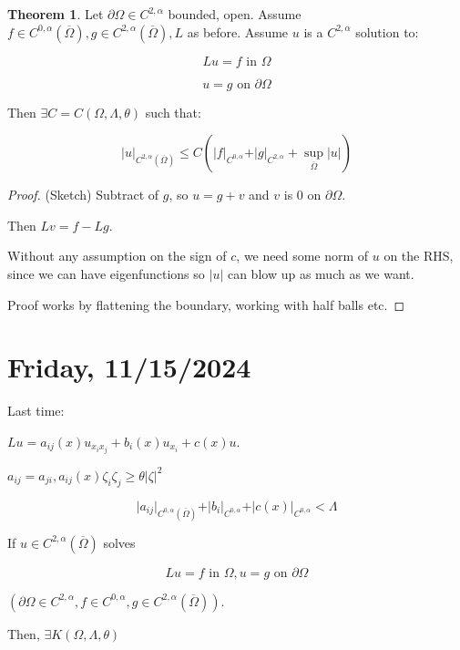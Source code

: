\documentclass{article}
\theoremstyle{definition}
\newtheorem{theorem}{Theorem}
\begin{document}
\begin{theorem}
    Let \(\partial\Omega \in C^{2,\alpha}\) bounded, open. Assume \(f\in C^{0,\alpha}(\overline{\Omega}),g\in C^{2,\alpha}(\overline{\Omega }),L\) as before. Assume \(u\) is a \(C^{2,\alpha}\) solution to:

    \[
        Lu = f \text{ in } \Omega 
    \]

    \[
        u = g \text{ on } \partial \Omega
    \]

    Then \(\exists C = C(\Omega, \Lambda, \theta)\) such that:

    \[
        \vert u \vert_{C^{2,\alpha}(\overline{\Omega})} \leq C \left( \vert f \vert_{C^{0,\alpha}} + \vert g \vert_{C^{2,\alpha}} + \sup_{\overline{\Omega}} \vert u \vert  \right) 
    \]
\end{theorem}


\begin{proof}
    (Sketch) Subtract of \(g\), so \(u = g+v\) and \(v\) is \(0\) on \(\partial \Omega\).

    Then \(Lv = f - Lg\).

    Without any assumption on the sign of \(c\), we need some norm of \(u\) on the RHS, since we can have eigenfunctions so \(\vert u \vert\) can blow up as much as we want.

    Proof works by flattening the boundary, working with half balls etc.

\end{proof}

\section*{Friday, 11/15/2024}

Last time:

\(Lu = a_{ij} (x) u_{x_i x_j} + b_i (x) u_{x_i} + c(x)u\).

\(a_{ij} = a_{ji}, a_{ij} (x) \zeta_i \zeta_j \geq \theta \vert \zeta \vert ^ 2\)

\[
    \vert a_{ij} \vert_{C^{0,\alpha}(\overline{\Omega})} + \vert b_i \vert_{C^{0,\alpha}} + \vert c(x) \vert_{C^{0,\alpha}} < \Lambda
\]

If \(u \in C^{2,\alpha}(\overline{\Omega} )\) solves

\[
    Lu = f \text{ in } \Omega, u = g \text{ on } \partial \Omega
\]

\((\partial \Omega\in C^{2,\alpha}, f\in C^{0,\alpha}, g \in C^{2,\alpha}(\overline{\Omega}))\).

Then, \(\exists K(\Omega , \Lambda, \theta)\) 
\end{document}
